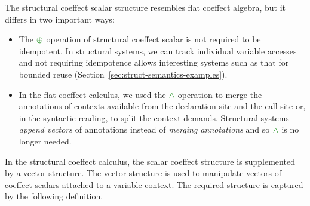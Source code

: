 \noindent
The structural coeffect scalar structure resembles flat coeffect algebra, but it differs in two important ways:
%
\begin{itemize}
\item The $\cpar$ operation of structural coeffect scalar is not required to be idempotent. In structural
  systems, we can track individual variable accesses and not requiring idempotence allows interesting
  systems such as that for bounded reuse (Section~\ref{sec:struct-semantics-examples}).

\item In the flat coeffect calculus, we used the $\czip$ operation to merge the annotations of contexts
  available from the declaration site and the call site or, in the syntactic reading, to split the
  context demands. Structural systems \emph{append vectors} of annotations instead of
  \emph{merging annotations} and so $\czip$ is no longer needed.
\end{itemize}

\noindent
In the structural coeffect calculus, the scalar coeffect structure is supplemented by a vector
structure. The vector structure is used to manipulate vectors of coeffect scalars attached to a
variable context. The required structure is captured by the following definition.

